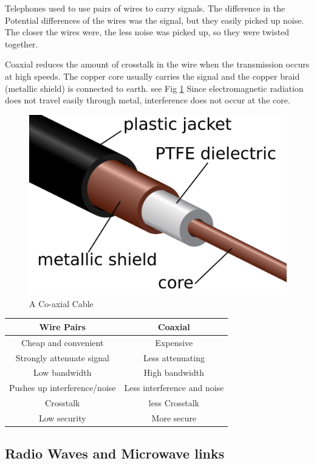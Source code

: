 \documentclass{scrbook}
\begin{document}
	Telephones used to use pairs of wires to carry signals. The difference in the Potential differences of the wires was the signal, but they easily picked up noise. The closer the wires were, the less noise was picked up, so they were twisted together.

	Coaxial reduces the amount of crosstalk in the wire when the transmission occurs at high speeds. The copper core usually carries the signal and the copper braid (metallic shield) is connected to earth. see Fig \ref{coaxial} Since electromagnetic radiation does not travel easily through metal, interference does not occur at the core.

	\begin{figure}[t]
		\label{coaxial}
		\caption{A Co-axial Cable \cite{wikicomm:coax}}
		\includegraphics[width=\linewidth]{assets/coaxial.png}
	\end{figure}

	\begin{tabular}{| c | c |}
		\hline
		Wire Pairs & Coaxial \\
		\hline 
		Cheap and convenient & Expensive \\
		Strongly attenuate signal & Less attenuating \\ 
		Low bandwidth & High bandwidth \\ 
		Pushes up interference/noise & Less interference and noise \\ 
		Crosstalk & less Crosstalk \\ 
		Low security & More secure \\ 
		\hline
	\end{tabular}

\subsection{Radio Waves and Microwave links}
\end{document}
